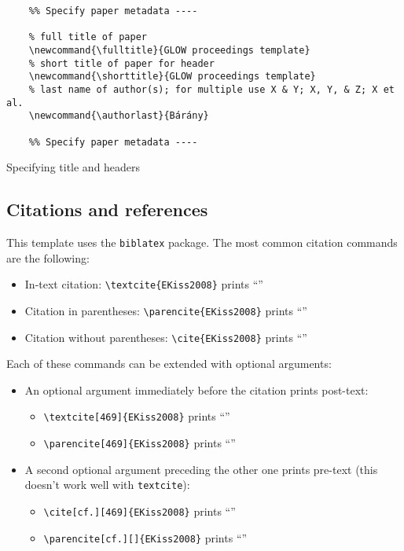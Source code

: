 \begin{listing}[H]
    \begin{verbatim}
    %% Specify paper metadata ----
    
    % full title of paper
    \newcommand{\fulltitle}{GLOW proceedings template}
    % short title of paper for header
    \newcommand{\shorttitle}{GLOW proceedings template}
    % last name of author(s); for multiple use X & Y; X, Y, & Z; X et al.
    \newcommand{\authorlast}{Bárány}
    
    %% Specify paper metadata ----
    \end{verbatim}
    \caption{Specifying title and headers}\label{lst:metadata}
\end{listing}

\subsection{Citations and references}\label{sec:bibliography}

This template uses the \texttt{biblatex} package. The most common citation
commands are the following:

\begin{itemize}
    \item In-text citation: \verb+\textcite{EKiss2008}+ prints \enquote{\textcite{EKiss2008}}
    \item Citation in parentheses: \verb+\parencite{EKiss2008}+ prints \enquote{\parencite{EKiss2008}}
    \item Citation without parentheses: \verb+\cite{EKiss2008}+ prints \enquote{\cite{EKiss2008}}
\end{itemize}

Each of these commands can be extended with optional arguments:

\begin{itemize}
    \item An optional argument immediately before the citation prints post-text:
    \begin{itemize}
        \item \verb+\textcite[469]{EKiss2008}+ prints \enquote{\textcite[469]{EKiss2008}}
        \item \verb+\parencite[469]{EKiss2008}+ prints \enquote{\parencite[469]{EKiss2008}}
    \end{itemize}
    \item A second optional argument preceding the other one prints pre-text (this doesn't work well with \verb+textcite+):
    \begin{itemize}
        \item \verb+\cite[cf.][469]{EKiss2008}+ prints \enquote{\cite[cf.][469]{EKiss2008}}
        \item \verb+\parencite[cf.][]{EKiss2008}+ prints \enquote{\parencite[cf.][]{EKiss2008}}
    \end{itemize}
\end{itemize}

